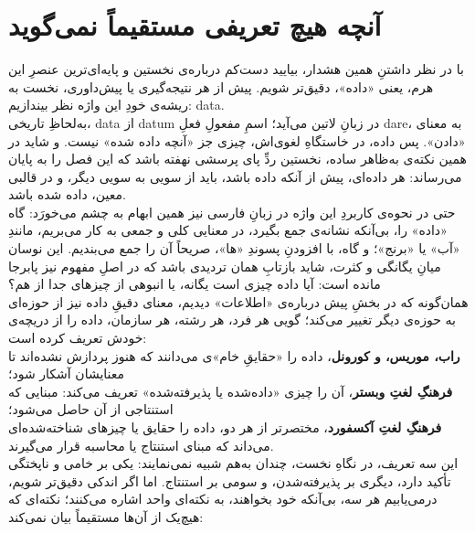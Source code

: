 \section{آنچه هیچ تعریفی مستقیماً نمی‌گوید}
\label{sec:what-no-definition-says}
با در نظر داشتنِ همین هشدار، بیایید دست‌کم درباره‌ی نخستین و پایه‌ای‌ترین عنصرِ این هرم، یعنی «داده»، دقیق‌تر شویم. پیش از هر نتیجه‌گیری یا پیش‌داوری، نخست به ریشه‌ی خودِ این واژه نظر بیندازیم: data.\\
به‌لحاظِ تاریخی، data از datum در زبانِ لاتین می‌آید؛ اسمِ مفعولِ فعلِ dare، به معنای «دادن». پس داده، در خاستگاهِ لغوی‌اش، چیزی جز «آنچه داده شده» نیست. و شاید در همین نکته‌ی به‌ظاهر ساده، نخستین ردِّ پای پرسشی نهفته باشد که این فصل را به پایان می‌رساند: هر داده‌ای، پیش از آنکه داده باشد، باید از سویی به سویی دیگر، و در قالبی معین، داده شده باشد.\\
حتی در نحوه‌ی کاربردِ این واژه در زبانِ فارسی نیز همین ابهام به چشم می‌خورَد: گاه «داده» را، بی‌آنکه نشانه‌ی جمع بگیرد، در معنایی کلی و جمعی به کار می‌بریم، مانندِ «آب» یا «برنج»؛ و گاه، با افزودنِ پسوندِ «ها»، صریحاً آن را جمع می‌بندیم. این نوسان میانِ یگانگی و کثرت، شاید بازتابِ همان تردیدی باشد که در اصلِ مفهوم نیز پابرجا مانده است: آیا داده چیزی است یگانه، یا انبوهی از چیزهای جدا از هم؟\\
همان‌گونه که در بخشِ پیش درباره‌ی «اطلاعات» دیدیم، معنای دقیقِ داده نیز از حوزه‌ای به حوزه‌ی دیگر تغییر می‌کند؛ گویی هر فرد، هر رشته، هر سازمان، داده را از دریچه‌ی خودش تعریف کرده است\autocite{floridi2010,zins2007}:\\
\textbf{راب، موریس، و کورونل}، داده را «حقایقِ خام»ی می‌دانند که هنوز پردازش نشده‌اند تا معنایشان آشکار شود\autocite{rob2013}؛\\
\textbf{فرهنگِ لغتِ وبستر}، آن را چیزی «داده‌شده یا پذیرفته‌شده» تعریف می‌کند: مبنایی که استنتاجی از آن حاصل می‌شود\autocite{websters1934}؛\\
\textbf{فرهنگِ لغتِ آکسفورد}، مختصرتر از هر دو، داده را حقایق یا چیزهای شناخته‌شده‌ای می‌داند که مبنای استنتاج یا محاسبه قرار می‌گیرند\autocite{oed2023}.\\
این سه تعریف، در نگاهِ نخست، چندان به‌هم شبیه نمی‌نمایند: یکی بر خامی و ناپختگی تأکید دارد، دیگری بر پذیرفته‌شدن، و سومی بر استنتاج. اما اگر اندکی دقیق‌تر شویم، درمی‌یابیم هر سه، بی‌آنکه خود بخواهند، به نکته‌ای واحد اشاره می‌کنند؛ نکته‌ای که هیچ‌یک از آن‌ها مستقیماً بیان نمی‌کند:

